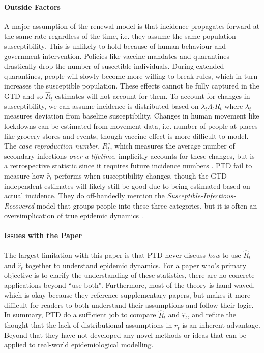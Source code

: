 \documentclass[12pt]{article}
\begin{document}
      \paragraph{Outside Factors} A major assumption of the renewal model is that incidence propagates forward at the same rate
      regardless of the time, i.e. they assume the same population susceptibility. 
      This is unlikely to hold because of human behaviour and government intervention. Policies
      like vaccine mandates and quarantines drastically drop the number of suscetible individuals. 
      During extended quarantines, people will slowly become more willing to break rules, which in turn increases the susceptible population.
      These effects cannot be fully captured in the GTD and so $\hat{R}_t$ estimates will not account for them. 
      To account for changes in susceptibility, we can assume incidence is distributed based on $\lambda_t \Lambda_t R_t$
      where $\lambda_t$ measures deviation from baseline susceptibility. Changes in human movement like lockdowns
      can be estimated from movement data, i.e. number of people at places like grocery stores and events, though vaccine effect
      is more difficult to model. The \textit{case reproduction number}, $R^c_t$, which measures the average number of secondary infections 
      \textit{over a lifetime}, implicitly accounts for these changes, but is a
      retrospective statistic since it requires future incidence numbers \citep{Cori2013}. PTD fail to measure how
      $\hat{r}_t$ performs when susceptibility changes, though the GTD-independent estimates will likely still be good due to being
      estimated based on actual incidence. They do off-handedly mention the
      \textit{Susceptible-Infectious-Recovered} model that groups people into these three categories, but it is often an
      oversimplication of true epidemic dynamics \citep{Lloyd2009}.  

      
      \paragraph{Issues with the Paper} The largest limitation with this paper is that PTD never discuss \textit{how} to use 
      $\hat{R}_t$ and  $\hat{r}_t$ together to
      understand epidemic dynamics. For a paper who's primary objective is to clarify the understanding of these statistics, 
      there are no concrete applications beyond ``use both". Furthermore, most of the theory is hand-waved, which is okay
      because they reference supplementary papers, but makes it more difficult for readers to both understand their assumptions and follow
      their logic. In summary, PTD do a sufficient job to compare $\hat{R}_t$ and $\hat{r}_t$, and refute the thought that the lack
      of distributional assumptions in $\hat{r}_t$ is an inherent advantage. Beyond that they have not developed any novel 
      methods or ideas that can be applied to real-world epidemiological modelling. 
\end{document}
